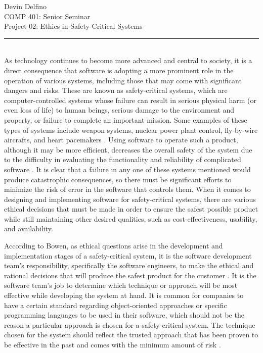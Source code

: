 \documentclass[12pt]{article}
\begin{document}
  \noindent
  Devin Delfino\\
  COMP 401: Senior Seminar\\
  Project 02: Ethics in Safety-Critical Systems\\
  \rule{\textwidth}{1pt}\\

  As technology continues to become more advanced and central to society, it is a direct consequence that software is adopting a more prominent role in the operation of various systems, including those that may come with significant dangers and risks. These are known as safety-critical systems, which are computer-controlled systems whose failure can result in serious physical harm (or even loss of life) to human beings, serious damage to the environment and property, or failure to complete an important mission. Some examples of these types of systems include weapon systems, nuclear power plant control, fly-by-wire aircrafts, and heart pacemakers \cite{ref2}. Using software to operate such a product, although it may be more efficient, decreases the overall safety of the system due to the difficulty in evaluating the functionality and reliability of complicated software \cite{ref1}. It is clear that a failure in any one of these systems mentioned would produce catastrophic consequences, so there must be significant efforts to minimize the risk of error in the software that controls them. When it comes to designing and implementing software for safety-critical systems, there are various ethical decisions that must be made in order to ensure the safest possible product while still maintaining other desired qualities, such as cost-effectiveness, usability, and availability.

  According to Bowen, as ethical questions arise in the development and implementation stages of a safety-critical system, it is the software development team's responsibility, specifically the software engineers, to make the ethical and rational decisions that will produce the safest product for the customer \cite{ref1}. It is the software team's job to determine which technique or approach will be most effective while developing the system at hand. It is common for companies to have a certain standard regarding object-oriented approaches or specific programming languages to be used in their software, which should not be the reason a particular approach is chosen for a safety-critical system. The technique chosen for the system should reflect the trusted approach that has been proven to be effective in the past and comes with the minimum amount of risk \cite{ref1}.
\end{document}
